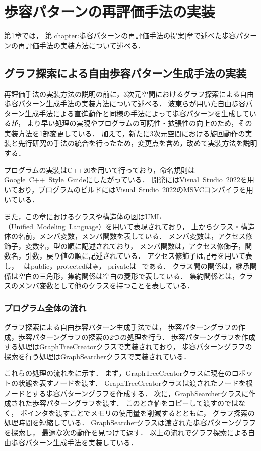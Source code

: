 ﻿%

\chapter{歩容パターンの再評価手法の実装}\label{chapter:歩容パターンの再評価手法の実装}
第\ref{chapter:歩容パターンの再評価手法の実装}章では，
第\ref{chapter:歩容パターンの再評価手法の提案}章で述べた歩容パターンの再評価手法の実装方法について述べる．

\section{グラフ探索による自由歩容パターン生成手法の実装}
再評価手法の実装方法の説明の前に，3次元空間におけるグラフ探索による自由歩容パターン生成手法の実装方法について述べる．
波東らが用いた自由歩容パターン生成手法による直進動作と同様の手法によって歩容パターンを生成しているが，
より早い処理の実現やプログラムの可読性・拡張性の向上のため，その実装方法を1部変更している．
加えて，新たに3次元空間における旋回動作の実装と先行研究の手法の統合を行ったため，変更点を含め，改めて実装方法を説明する．

プログラムの実装はC++20を用いて行っており，命名規則はGoogle~C++~Style~Guide\cite{cita:google_cpp_style_guide}にしたがっている．
開発にはVisual~Studio~2022を用いており，プログラムのビルドにはVisual~Studio~2022のMSVCコンパイラを用いている．

また，この章におけるクラスや構造体の図はUML（Unified~Modeling~Language）を用いて表現されており，
上からクラス・構造体の名前，メンバ変数，メンバ関数を表している．
メンバ変数は，アクセス修飾子，変数名，型の順に記述されており，
メンバ関数は，アクセス修飾子，関数名，引数，戻り値の順に記述されている．
アクセス修飾子は記号を用いて表し，+はpublic，protectedは\#，
privateは$-$である．
クラス間の関係は，継承関係は空白の三角形，集約関係は空白の菱形で表している．
集約関係とは，クラスのメンバ変数として他のクラスを持つことを表している．

\subsection{プログラム全体の流れ}
グラフ探索による自由歩容パターン生成手法では，
歩容パターングラフの作成，歩容パターングラフの探索の2つの処理を行う．
歩容パターングラフを作成する処理はGraphTreeCreatorクラスで実装されており，
歩容パターングラフの探索を行う処理はGraphSearcherクラスで実装されている．

これらの処理の流れをに示す．
まず，GraphTreeCreatorクラスに現在のロボットの状態を表すノードを渡す．
GraphTreeCreatorクラスは渡されたノードを根ノードとする歩容パターングラフを作成する．
次に，GraphSearcherクラスに作成された歩容パターングラフを渡す．
このとき値をコピーして渡すのではなく，
ポインタを渡すことでメモリの使用量を削減するとともに，
グラフ探索の処理時間を短縮している．
GraphSearcherクラスは渡された歩容パターングラフを探索し，
最適な次の動作を見つけて返す．
以上の流れでグラフ探索による自由歩容パターン生成手法を実装している．

